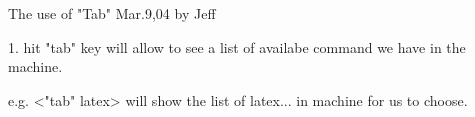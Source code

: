 The use of "Tab"  Mar.9,04 by Jeff

1.  hit "tab" key will allow to see a list of availabe command we have
in the machine. 

e.g.  <"tab" latex>  will show the list of latex... in machine for us 
to choose. 
